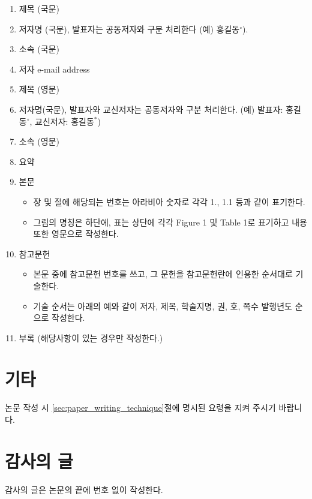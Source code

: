\documentclass[a4paper,twocolumn]{article}
\begin{document}
\begin{enumerate}
	\item 제목 (국문)
	\item 저자명 (국문), 발표자는 공동저자와 구분 처리한다 (예) 홍길동$^{\circ}$).
	\item 소속 (국문)
	\item 저자 e-mail address
	\item 제목 (영문)
	\item 저자명(국문), 발표자와 교신저자는 공동저자와 구분 처리한다. (예) 발표자: 홍길동$^{\circ}$, 교신저자: 홍길동$^{*}$)
	\item 소속 (영문)
	\item 요약
	\item 본문
	\begin{itemize}
		\item[-] 장 및 절에 해당되는 번호는 아라비아 숫자로 각각 1., 1.1 등과 같이 표기한다.
		\item[-] 그림의 명칭은 하단에, 표는 상단에 각각 Figure 1 및 Table 1로 표기하고 내용 또한 영문으로 작성한다.
	\end{itemize}
	\item 참고문헌
	\begin{itemize}
		\item[-] 본문 중에 참고문헌 번호를 쓰고, 그 문헌을 참고문헌란에 인용한 순서대로 기술한다.
		\item[-] 기술 순서는 아래의 예와 같이 저자, 제목, 학술지명, 권, 호, 쪽수 발행년도 순으로 작성한다.
	\end{itemize}
	\item 부록 (해당사항이 있는 경우만 작성한다.)
\end{enumerate}


\section{기타}
\label{sec:misc}

논문 작성 시 \ref{sec:paper_writing_technique}절에 명시된 요령을 지켜 주시기 바랍니다.


\section*{감사의 글}

감사의 글은 논문의 끝에 번호 없이 작성한다.



\nocite{*}


\end{document}
